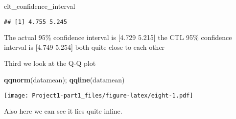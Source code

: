 \documentclass[
]{article}
\newenvironment{Shaded}{\begin{snugshade}}{\end{snugshade}}
\newcommand{\KeywordTok}[1]{\textcolor[rgb]{0.13,0.29,0.53}{\textbf{#1}}}
\newcommand{\NormalTok}[1]{#1}
\begin{document}
\begin{Shaded}
\begin{Highlighting}[]
\NormalTok{clt_confidence_interval}
\end{Highlighting}
\end{Shaded}

\begin{verbatim}
## [1] 4.755 5.245
\end{verbatim}

The actual 95\% confidence interval is {[}4.729 5.215{]} the CTL 95\%
confidence interval is {[}4.749 5.254{]} both quite close to each other

Third we look at the Q-Q plot

\begin{Shaded}
\begin{Highlighting}[]
\KeywordTok{qqnorm}\NormalTok{(datamean); }\KeywordTok{qqline}\NormalTok{(datamean)}
\end{Highlighting}
\end{Shaded}

\texttt{[image: Project1-part1\_files/figure-latex/eight-1.pdf]}

Also here we can see it lies quite inline.
\end{document}
